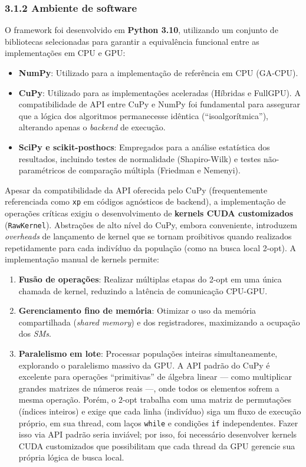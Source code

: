 \subsubsection{3.1.2 Ambiente de
software}\label{sec-312-ambiente-software}

O framework foi desenvolvido em \textbf{Python 3.10}, utilizando um
conjunto de bibliotecas selecionadas para garantir a equivalência
funcional entre as implementações em CPU e GPU:

\begin{itemize}
\tightlist
\item
  \textbf{NumPy}: Utilizado para a implementação de referência em CPU
  (GA-CPU).
\item
  \textbf{CuPy}: Utilizado para as implementações aceleradas (Híbridas e
  FullGPU). A compatibilidade de API entre CuPy e NumPy foi fundamental
  para assegurar que a lógica dos algoritmos permanecesse idêntica
  (``isoalgorítmica''), alterando apenas o \emph{backend} de execução.
\item
  \textbf{SciPy e scikit-posthocs}: Empregados para a análise
  estatística dos resultados, incluindo testes de normalidade
  (Shapiro-Wilk) e testes não-paramétricos de comparação múltipla
  (Friedman e Nemenyi).
\end{itemize}

Apesar da compatibilidade da API oferecida pelo CuPy (frequentemente
referenciada como \texttt{xp} em códigos agnósticos de backend), a
implementação de operações críticas exigiu o desenvolvimento de
\textbf{kernels CUDA customizados} (\texttt{RawKernel}). Abstrações de
alto nível do CuPy, embora conveniente, introduzem \emph{overheads} de
lançamento de kernel que se tornam proibitivos quando realizados
repetidamente para cada indivíduo da população (como na busca local
2-opt). A implementação manual de kernels permite:

\begin{enumerate}
\def\labelenumi{\arabic{enumi}.}
\tightlist
\item
  \textbf{Fusão de operações}: Realizar múltiplas etapas do 2-opt em uma
  única chamada de kernel, reduzindo a latência de comunicação CPU-GPU.
\item
  \textbf{Gerenciamento fino de memória}: Otimizar o uso da memória
  compartilhada (\emph{shared memory}) e dos registradores, maximizando
  a ocupação dos \emph{SMs}.
\item
  \textbf{Paralelismo em lote}: Processar populações inteiras
  simultaneamente, explorando o paralelismo massivo da GPU. A API padrão
  do CuPy é excelente para operações ``primitivas'' de álgebra linear
  --- como multiplicar grandes matrizes de números reais ---, onde todos
  os elementos sofrem a mesma operação. Porém, o \(2\)-opt trabalha com
  uma matriz de permutações (índices inteiros) e exige que cada linha
  (indivíduo) siga um fluxo de execução próprio, em sua thread, com
  laços \texttt{while} e condições \texttt{if} independentes. Fazer isso
  via API padrão seria inviável; por isso, foi necessário desenvolver
  kernels CUDA customizados que possibilitam que cada thread da GPU
  gerencie sua própria lógica de busca local.
\end{enumerate}

